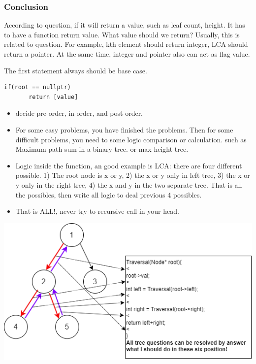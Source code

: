 \documentclass[a4paper,11pt,twoside]{book}
\begin{document}
\subsubsection{Conclusion}

	\par According to question, if it will return a value, such as leaf count, height. It has to have a function return value. What value should we return? Usually, this is related to question. For example, kth element should return integer, LCA should return a pointer. At the same time, integer and pointer also can act as flag value. 

 
	\par The first statement always should be base case.
\begin{lstlisting}[breaklines]
if(root == nullptr) 
       return [value]
\end{lstlisting}

	
	
\begin{itemize}
	\item decide pre-order, in-order, and post-order. 

	\item For some easy problems, you have finished the problems. Then for some difficult problems, you need to some logic comparison or calculation. such as Maximum path sum in a binary tree. or max height tree.
	
	\item Logic inside the function, an good example is LCA: there are four different possible. 1) The root node is x or y, 2) the x or y only in left tree, 3) the x or y only in the right tree, 4) the x and y in the two separate tree. That is all the possibles, then write all logic to deal previous 4 possibles. 
	
	\item That is ALL!, never try to recursive call in your head. 
\end{itemize}

\begin{center}
	\includegraphics[scale=0.66]{pics/tree.drawio.png} 
\end{center}
\end{document}
